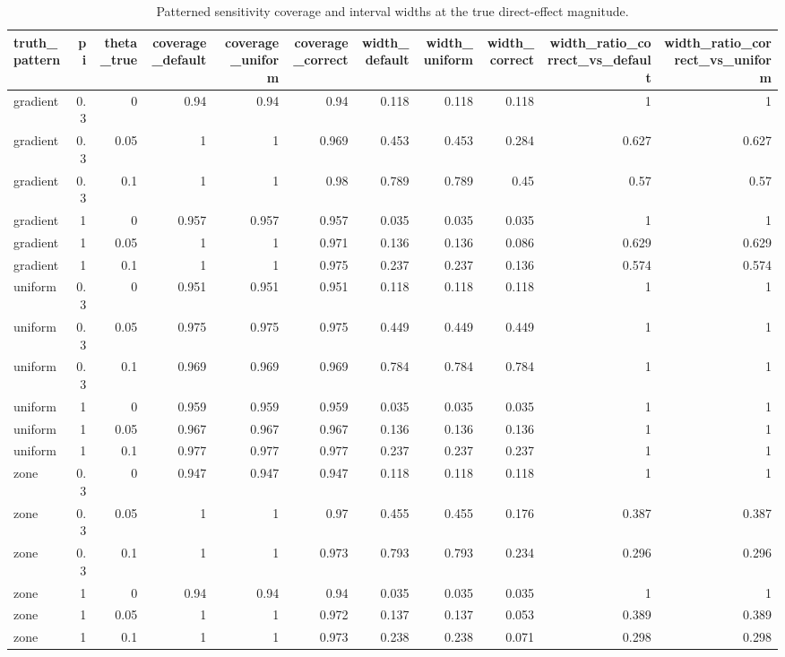 \begin{table}[!htbp]
\centering
\caption{Patterned sensitivity coverage and interval widths at the true direct-effect magnitude.}
\label{tab:patterned-sensitivity}
\begin{tabular}{lrrrrrrrrrr}
\hline
truth\_pattern & pi & theta\_true & coverage\_default & coverage\_uniform & coverage\_correct & width\_default & width\_uniform & width\_correct & width\_ratio\_correct\_vs\_default & width\_ratio\_correct\_vs\_uniform
\\
\hline
gradient & 0.3 & 0 & 0.94 & 0.94 & 0.94 & 0.118 & 0.118 & 0.118 & 1 & 1 \\
gradient & 0.3 & 0.05 & 1 & 1 & 0.969 & 0.453 & 0.453 & 0.284 & 0.627 & 0.627 \\
gradient & 0.3 & 0.1 & 1 & 1 & 0.98 & 0.789 & 0.789 & 0.45 & 0.57 & 0.57 \\
gradient & 1 & 0 & 0.957 & 0.957 & 0.957 & 0.035 & 0.035 & 0.035 & 1 & 1 \\
gradient & 1 & 0.05 & 1 & 1 & 0.971 & 0.136 & 0.136 & 0.086 & 0.629 & 0.629 \\
gradient & 1 & 0.1 & 1 & 1 & 0.975 & 0.237 & 0.237 & 0.136 & 0.574 & 0.574 \\
uniform & 0.3 & 0 & 0.951 & 0.951 & 0.951 & 0.118 & 0.118 & 0.118 & 1 & 1 \\
uniform & 0.3 & 0.05 & 0.975 & 0.975 & 0.975 & 0.449 & 0.449 & 0.449 & 1 & 1 \\
uniform & 0.3 & 0.1 & 0.969 & 0.969 & 0.969 & 0.784 & 0.784 & 0.784 & 1 & 1 \\
uniform & 1 & 0 & 0.959 & 0.959 & 0.959 & 0.035 & 0.035 & 0.035 & 1 & 1 \\
uniform & 1 & 0.05 & 0.967 & 0.967 & 0.967 & 0.136 & 0.136 & 0.136 & 1 & 1 \\
uniform & 1 & 0.1 & 0.977 & 0.977 & 0.977 & 0.237 & 0.237 & 0.237 & 1 & 1 \\
zone & 0.3 & 0 & 0.947 & 0.947 & 0.947 & 0.118 & 0.118 & 0.118 & 1 & 1 \\
zone & 0.3 & 0.05 & 1 & 1 & 0.97 & 0.455 & 0.455 & 0.176 & 0.387 & 0.387 \\
zone & 0.3 & 0.1 & 1 & 1 & 0.973 & 0.793 & 0.793 & 0.234 & 0.296 & 0.296 \\
zone & 1 & 0 & 0.94 & 0.94 & 0.94 & 0.035 & 0.035 & 0.035 & 1 & 1 \\
zone & 1 & 0.05 & 1 & 1 & 0.972 & 0.137 & 0.137 & 0.053 & 0.389 & 0.389 \\
zone & 1 & 0.1 & 1 & 1 & 0.973 & 0.238 & 0.238 & 0.071 & 0.298 & 0.298 \\
\hline
\end{tabular}
\end{table}

